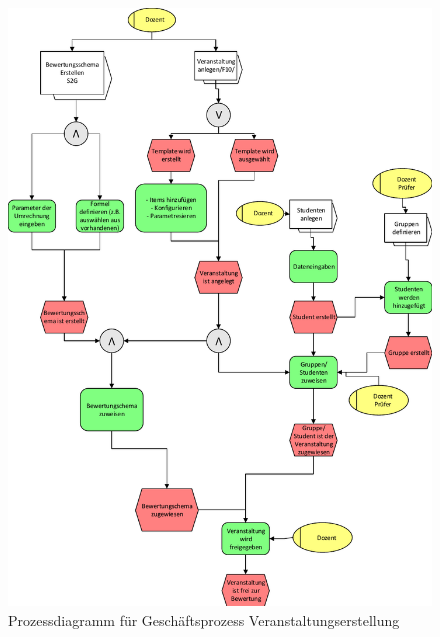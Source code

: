 	\begin{figure}[th!]
	\centering
	\includegraphics[width=\textwidth]{./img/ablauf_1}
	\caption{Prozessdiagramm für Geschäftsprozess Veranstaltungserstellung}
	\label{fig:process1}
	\end{figure}
		
